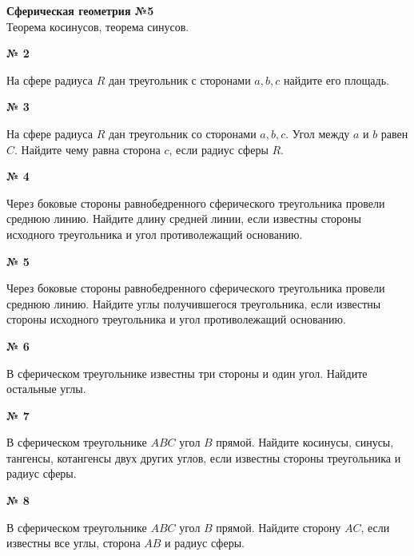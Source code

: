 


    \begin{center}
        \textbf{Сферическая геометрия №5}\\
        Теорема косинусов, теорема синусов.
    \end{center}


    \begin{center}
        \textbf{№ 2}
    \end{center}

    На сфере радиуса $R$ дан треугольник с сторонами $a, b, c$ найдите его площадь.

    \begin{center}
        \textbf{№ 3}
    \end{center}

    На сфере радиуса $R$ дан треугольник со сторонами $a, b, c$.
    Угол между $a$ и $b$ равен $C$.
    Найдите чему равна сторона $c$, если радиус сферы $R$.

    \begin{center}
        \textbf{№ 4}
    \end{center}

    Через боковые стороны равнобедренного сферического треугольника провели среднюю линию.
    Найдите длину средней линии, если известны стороны исходного треугольника и угол противолежащий основанию.


    \begin{center}
        \textbf{№ 5}
    \end{center}

    Через боковые стороны равнобедренного сферического треугольника провели среднюю линию.
    Найдите углы получившегося треугольника, если известны стороны исходного треугольника и угол противолежащий основанию.

    \begin{center}
        \textbf{№ 6}
    \end{center}

    В сферическом треугольнике известны три стороны и один угол.
    Найдите остальные углы.

    \begin{center}
        \textbf{№ 7}
    \end{center}

    В сферическом треугольнике $ABC$ угол $B$ прямой.
    Найдите косинусы, синусы, тангенсы, котангенсы двух других углов,
    если известны стороны треугольника и радиус сферы.

    \begin{center}
        \textbf{№ 8}
    \end{center}

    В сферическом треугольнике $ABC$ угол $B$ прямой.
    Найдите сторону $AC$, если известны все углы, сторона $AB$ и радиус сферы.



